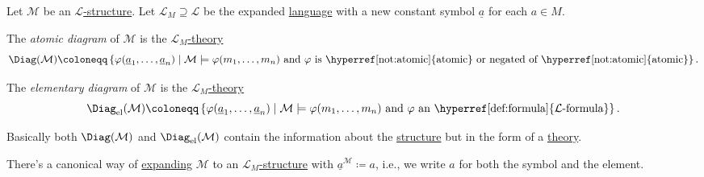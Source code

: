 \begin{definition*}
	Let \(\mathcal{M} \) be an \hyperref[def:structure]{\(\mathcal{L}\)-structure}. Let \(\mathcal{L} _M \supseteq \mathcal{L} \)  be the expanded \hyperref[def:language]{language} with a new constant symbol \(\underline{a}\) for each \(a\in M\).

	\begin{definition}\label{def:atomic-diagram}
		The \emph{atomic diagram} of \(\mathcal{M} \) is the \hyperref[def:theory]{\(\mathcal{L} _{M}\)-theory}
		\[
			\Diag(\mathcal{M} ) \coloneqq \left\{ \varphi (\underline{a}_1, \ldots , \underline{a}_n) \mid \mathcal{M} \models \varphi (m_1, \ldots , m_n) \text{ and \(\varphi \) is \hyperref[not:atomic]{atomic} or negated of \hyperref[not:atomic]{atomic}} \right\}.
		\]
	\end{definition}

	\begin{definition}\label{def:elementary-diagram}
		The \emph{elementary diagram} of \(\mathcal{M} \) is the \hyperref[def:theory]{\(\mathcal{L} _{M}\)-theory}
		\[
			\Diag_{\mathrm{el}}(\mathcal{M} ) \coloneqq \left\{ \varphi (\underline{a}_1, \ldots , \underline{a}_n) \mid \mathcal{M} \models \varphi (m_1, \ldots , m_n) \text{ and \(\varphi \) an \hyperref[def:formula]{\(\mathcal{L}\)-formula}} \right\}.
		\]
	\end{definition}
\end{definition*}

\begin{intuition}
	Basically both \(\Diag(\mathcal{M} )\) and \(\Diag_{\mathrm{el} }(\mathcal{M} )\) contain the information about the \hyperref[def:structure]{structure} but in the form of a \hyperref[def:theory]{theory}.
\end{intuition}

\begin{notation}
	There's a canonical way of \hyperref[not:expansion]{expanding} \(\mathcal{M} \) to an \hyperref[def:structure]{\(\mathcal{L} _M\)-structure} with \(\underline{a}^{\mathcal{M}} \coloneqq a\), i.e., we write \(a\) for both the symbol and the element.
\end{notation}

